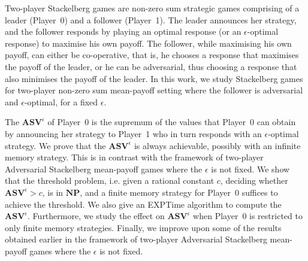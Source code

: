 Two-player Stackelberg games are non-zero sum strategic games comprising of a leader (Player~0) and a follower (Player~1). The leader announces her strategy, and the follower responds by playing an optimal response (or an $\epsilon$-optimal response) to maximise his own payoff. The follower, while maximising his own payoff, can either be co-operative, that is, he chooses a response that maximises the payoff of the leader, or he can be adversarial, thus choosing a response that also minimises the payoff of the leader. In this work, we study Stackelberg games for two-player non-zero sum mean-payoff setting where the follower is adversarial and $\epsilon$-optimal, for a fixed $\epsilon$.

The $\mathbf{ASV}^{\epsilon}$ of Player~0 is the supremum of the values that Player~0 can obtain by announcing her strategy to Player~1 who in turn responds with an $\epsilon$-optimal strategy.
We prove that the $\mathbf{ASV}^{\epsilon}$ is always achievable, possibly with an infinite memory strategy.
This is in contrast with the framework of two-player Adversarial Stackelberg mean-payoff games where the $\epsilon$ is not fixed.
We show that the threshold problem, i.e. given a rational constant $c$, deciding whether $\mathbf{ASV}^{\epsilon} > c$, is in $\textbf{NP}$, and a finite memory strategy for Player~0 suffices to achieve the threshold.
We also give an {\sf EXPTime} algorithm to compute the $\mathbf{ASV}^{\epsilon}$.
Furthermore, we study the effect on $\mathbf{ASV}^{\epsilon}$ when Player~0 is restricted to only finite memory strategies.
Finally, we improve upon some of the results obtained earlier in the framework of two-player Adversarial Stackelberg mean-payoff games where the $\epsilon$ is not fixed.
